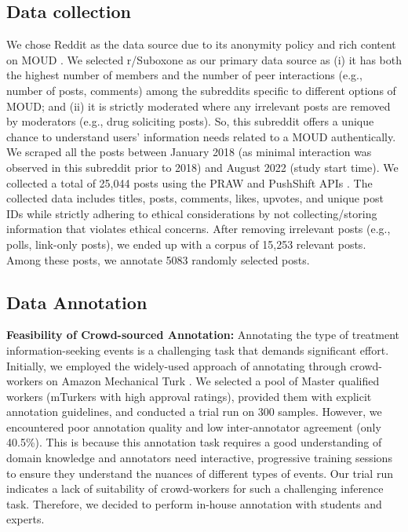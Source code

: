 \documentclass[letterpaper]{article}
\begin{document}
\subsection{Data collection}
We chose Reddit as the data source due to its anonymity policy and rich content on MOUD \cite{alternative_chi}. We selected r/Suboxone as our primary data source as (i) it has both the highest number of members and the number of peer interactions (e.g., number of posts, comments) among the subreddits specific to different options of MOUD; and (ii) it is strictly moderated where any irrelevant posts are removed by moderators (e.g., drug soliciting posts). So, this subreddit offers a unique chance to understand users' information needs related to a MOUD authentically. We scraped all the posts between January 2018 (as minimal interaction was observed in this subreddit prior to 2018) and August 2022 (study start time). We collected a total of 25,044 posts using the PRAW and PushShift APIs \cite{baumgartner2020pushshift}.  The collected data includes titles, posts, comments, likes, upvotes, and unique post IDs while strictly adhering to ethical considerations by not collecting/storing information that violates ethical concerns. After removing irrelevant posts (e.g., polls, link-only posts), we ended up with a corpus of 15,253 relevant posts. Among these posts, we annotate 5083 randomly selected posts.

\subsection{Data Annotation}

\textbf{Feasibility of Crowd-sourced Annotation:} Annotating the type of treatment information-seeking events is a challenging task that demands significant effort. Initially, we employed the widely-used approach of annotating through crowd-workers on Amazon Mechanical Turk \cite{mirzaei-etal-2023-real}. We selected a pool of Master qualified workers (mTurkers with high approval ratings), provided them with explicit annotation guidelines, and conducted a trial run on 300 samples. However, we encountered poor annotation quality and low inter-annotator agreement (only 40.5\%). This is because this annotation task requires a good understanding of domain knowledge and annotators need interactive, progressive training sessions to ensure they understand the nuances of different types of events. Our trial run indicates a lack of suitability of crowd-workers for such a challenging inference task. Therefore, we decided to perform in-house annotation with students and experts.
\end{document}
